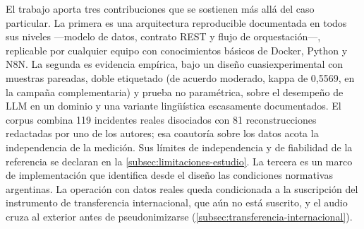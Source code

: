 El trabajo aporta tres contribuciones que se sostienen más allá del caso particular. La primera es una arquitectura reproducible documentada en todos sus niveles ---modelo de datos, contrato REST y flujo de orquestación---, replicable por cualquier equipo con conocimientos básicos de Docker, Python y N8N. La segunda es evidencia empírica, bajo un diseño cuasiexperimental con muestras pareadas, doble etiquetado (de acuerdo moderado, kappa de 0,5569, en la campaña complementaria) y prueba no paramétrica, sobre el desempeño de LLM en un dominio y una variante lingüística escasamente documentados. El corpus combina 119 incidentes reales disociados con 81 reconstrucciones redactadas por uno de los autores; esa coautoría sobre los datos acota la independencia de la medición. Sus límites de independencia y de fiabilidad de la referencia se declaran en la \autoref{subsec:limitaciones-estudio}. La tercera es un marco de implementación que identifica desde el diseño las condiciones normativas argentinas. La operación con datos reales queda condicionada a la suscripción del instrumento de transferencia internacional, que aún no está suscrito, y el audio cruza al exterior antes de pseudonimizarse (\autoref{subsec:transferencia-internacional}).

\newpage
